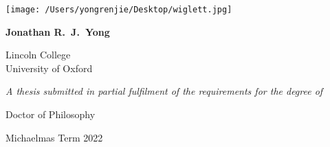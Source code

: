 \hspace{0pt}
\vfill
\begin{center}
    \Huge
    \textbf{\thesistitle}

    \vspace{0.6cm}

    \texttt{[image: /Users/yongrenjie/Desktop/wiglett.jpg]}

    \vspace{0.6cm}

    \LARGE
    \textbf{Jonathan R.\ J.\ Yong}

    \vspace{0.4cm}

    \Large
    Lincoln College \\ University of Oxford

    \vspace{1.0cm}

    \large
    \textit{A thesis submitted in partial fulfilment of the requirements for the degree of}

    \Large
    Doctor of Philosophy
    
    Michaelmas Term 2022
\end{center}
\thispagestyle{empty}
\vfill
\hspace{0pt}
\newpage

